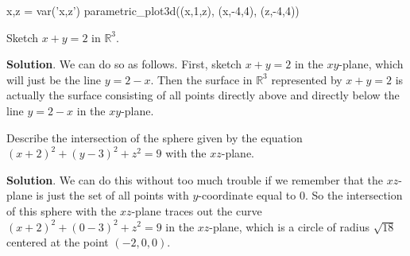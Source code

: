 \documentclass[10pt,]{book}
\theoremstyle{ptxplainnotitle}
\theoremstyle{ptxplaintitle}
\theoremstyle{ptxplainnotitle}
\theoremstyle{ptxplaintitle}
\theoremstyle{ptxplainnotitle}
\theoremstyle{ptxplaintitle}
\theoremstyle{ptxdefinitionnotitle}
\theoremstyle{ptxdefinitiontitle}
\theoremstyle{ptxdefinitionnotitle}
\theoremstyle{ptxdefinitiontitle}
\theoremstyle{ptxdefinitionnotitle}
\theoremstyle{ptxdefinitiontitle}
\theoremstyle{ptxdefinitionnotitle}
\theoremstyle{ptxdefinitiontitle}
\theoremstyle{ptxdefinitionnotitle}
\theoremstyle{ptxdefinitiontitle}
\numberwithin{equation}{section}
\newcommand{\RR}{\mathbb{R}}
\begin{document}
\begin{sageinput}
x,z = var('x,z')
parametric_plot3d((x,1,z), (x,-4,4), (z,-4,4))
\end{sageinput}
\begin{example}\label{example-more-equations-in-space}
\hypertarget{p-726}{}%
Sketch \(x+y=2\) in \(\RR^{3}\).%
\par\smallskip%
\noindent\textbf{Solution}.\hypertarget{solution-144}{}\quad%
\hypertarget{p-727}{}%
We can do so as follows. First, sketch \(x+y=2\) in the \(xy\)-plane, which will just be the line \(y = 2-x\). Then the surface in \(\RR^{3}\) represented by \(x+y=2\) is actually the surface consisting of all points directly above and directly below the line \(y=2-x\) in the \(xy\)-plane.%
\end{example}
\begin{example}\label{example-intersection-of-a-sphere-and-a-plane}
\hypertarget{p-728}{}%
Describe the intersection of the sphere given by the equation \((x+2)^{2} + (y-3)^{2} + z^{2} = 9\) with the \(xz\)-plane.%
\par\smallskip%
\noindent\textbf{Solution}.\hypertarget{solution-145}{}\quad%
\hypertarget{p-729}{}%
We can do this without too much trouble if we remember that the \(xz\)-plane is just the set of all points with \(y\)-coordinate equal to \(0\). So the intersection of this sphere with the \(xz\)-plane traces out the curve \((x+2)^{2} + (0-3)^{2} + z^{2} = 9\) in the \(xz\)-plane, which is a circle of radius \(\sqrt{18}\) centered at the point \((-2,0,0)\).%
\end{example}
\typeout{************************************************}
\typeout{************************************************}
\end{document}
